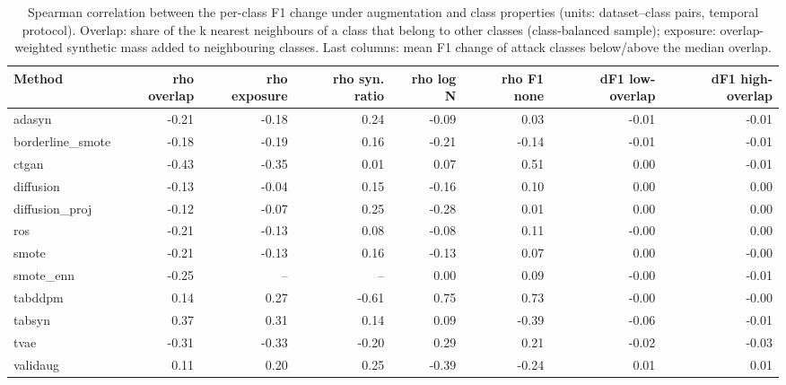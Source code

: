 \begin{table}[t]
\centering\small
\caption{Spearman correlation between the per-class F1 change under augmentation and class properties (units: dataset--class pairs, temporal protocol). Overlap: share of the k nearest neighbours of a class that belong to other classes (class-balanced sample); exposure: overlap-weighted synthetic mass added to neighbouring classes. Last columns: mean F1 change of attack classes below/above the median overlap.}
\label{tab:overlap}
\begin{tabular}{lrrrrrrr}
\toprule
Method & rho overlap & rho exposure & rho syn. ratio & rho log N & rho F1 none & dF1 low-overlap & dF1 high-overlap \\
\midrule
adasyn & -0.21 & -0.18 & 0.24 & -0.09 & 0.03 & -0.01 & -0.01 \\
borderline\_smote & -0.18 & -0.19 & 0.16 & -0.21 & -0.14 & -0.01 & -0.01 \\
ctgan & -0.43 & -0.35 & 0.01 & 0.07 & 0.51 & 0.00 & -0.01 \\
diffusion & -0.13 & -0.04 & 0.15 & -0.16 & 0.10 & 0.00 & 0.00 \\
diffusion\_proj & -0.12 & -0.07 & 0.25 & -0.28 & 0.01 & 0.00 & 0.00 \\
ros & -0.21 & -0.13 & 0.08 & -0.08 & 0.11 & -0.00 & 0.00 \\
smote & -0.21 & -0.13 & 0.16 & -0.13 & 0.07 & 0.00 & -0.00 \\
smote\_enn & -0.25 & -- & -- & 0.00 & 0.09 & -0.00 & -0.01 \\
tabddpm & 0.14 & 0.27 & -0.61 & 0.75 & 0.73 & -0.00 & -0.00 \\
tabsyn & 0.37 & 0.31 & 0.14 & 0.09 & -0.39 & -0.06 & -0.01 \\
tvae & -0.31 & -0.33 & -0.20 & 0.29 & 0.21 & -0.02 & -0.03 \\
validaug & 0.11 & 0.20 & 0.25 & -0.39 & -0.24 & 0.01 & 0.01 \\
\bottomrule
\end{tabular}
\end{table}
